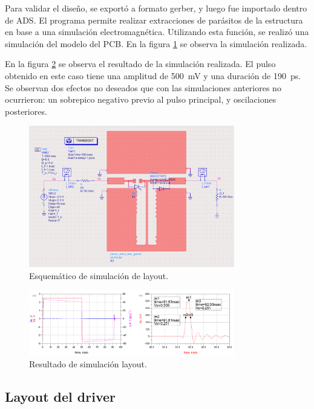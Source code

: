 Para validar el diseño, se exportó a formato gerber, y luego fue importado
dentro de ADS. El programa permite realizar extracciones de parásitos de la
estructura en base a una simulación electromagnética. Utilizando esta función,
se realizó una simulación del modelo del PCB. En la figura
\ref{fig:layout_simulation_sch} se observa la simulación realizada.

En la figura \ref{fig:layout_simulation_result} se observa el resultado de la
simulación realizada. El pulso obtenido en este caso tiene una amplitud de
\qty{500}{\milli\volt} y una duración de \qty{190}{\pico\second}. Se observan
dos efectos no deseados que con las simulaciones anteriores no ocurrieron: un
sobrepico negativo previo al pulso principal, y oscilaciones posteriores.

\begin{figure}[t!]
    \centering
    \includegraphics[width=0.8\textwidth]{images/layout_simulation_sch.png}
    \caption{Esquemático de simulación de layout.}
    \label{fig:layout_simulation_sch}
\end{figure}

\begin{figure}[t!]
    \centering
    \includegraphics[width=0.8\textwidth]{images/layout_simulation_result.png}
    \caption{Resultado de simulación layout.}
    \label{fig:layout_simulation_result}
\end{figure}

\subsection{Layout del driver}

